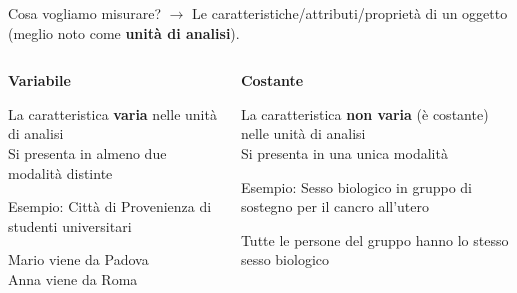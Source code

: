 \documentclass[compress]{beamer}
\begin{document}
\begin{frame}
	Cosa vogliamo misurare? $\rightarrow$ Le caratteristiche/attributi/proprietà di un oggetto (meglio noto come \textbf{unità di analisi}). 
	\begin{columns}[T]
		\begin{column}{.5\linewidth}
			\begin{center}
				\textbf{Variabile}
			\end{center}
			
			La caratteristica \textbf{varia} nelle unità di analisi \\
			Si presenta in almeno due modalità distinte
			
			\begin{exampleblock}{Esempio: Città di Provenienza di studenti universitari}
				
				Mario viene da Padova\\ Anna viene da Roma
			\end{exampleblock}
		\end{column}
		\begin{column}{.5\linewidth}
			\begin{center}
				\textbf{Costante}
			\end{center}
			
			La caratteristica \textbf{non varia} (è costante) nelle unità di analisi \\
			Si presenta in una unica modalità
			
			\begin{exampleblock}{Esempio: Sesso biologico in gruppo di sostegno per il cancro all'utero}
				
				Tutte le persone del gruppo hanno lo stesso sesso biologico
			\end{exampleblock}
		\end{column}
	\end{columns}
	
\end{frame}
\end{document}
